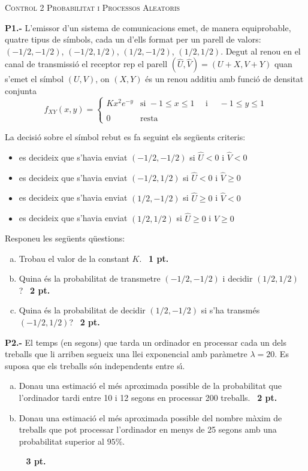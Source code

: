 \documentclass{report}
\begin{document}
\begin{center}
\textsc{Control 2 Probabilitat i Processos Aleatoris}
\end{center}

\vspace{1 cm}
\noindent\textbf{P1.-}
L'emissor d'un sistema de comunicacions emet, de manera equiprobable, quatre
tipus de s\'imbols, cada un d'ells format per un parell de valors:
$(-1/2, -1/2)$, $(-1/2, 1/2)$, $(1/2, -1/2)$, $(1/2, 1/2)$. Degut al renou en el canal de
transmissi\'o el receptor rep el parell $(\hat{U}, \hat{V})=(U+X, V+Y)$ quan
s'emet el s\'imbol $(U, V)$, on $(X, Y)$ \'es un renou additiu amb funci\'o de
densitat conjunta
\[
f_{XY}(x, y)=\begin{cases}
K x^2 e^{-y} & \text{si } -1 \leq x \leq 1 \quad \text{ i } \quad -1 \leq y \leq 1 \\ \\
0 & \text{resta}
\end{cases}
\]

La decisi\'o sobre el s\'imbol rebut es fa seguint els seg\"uents criteris:
\begin{itemize}
\item es decideix que s'havia enviat $(-1/2, -1/2)$ si $\hat{U} < 0$ i $\hat{V} < 0$
\item es decideix que s'havia enviat $(-1/2, 1/2)$ si $\hat{U} < 0$ i $\hat{V} \geq 0$
\item es decideix que s'havia enviat $(1/2, -1/2)$ si $\hat{U} \geq 0$ i $\hat{V} < 0$
\item es decideix que s'havia enviat $(1/2, 1/2)$ si $\hat{U} \geq 0$ i $\hat{V} \geq 0$
\end{itemize}

Responeu les seg\"uents q\"uestions:
\begin{enumerate}[a)]
\item Trobau el valor de la constant $K$.\ \hfill{\textbf{ 1 pt.}}
\item Quina \'es la probabilitat de transmetre $(-1/2, -1/2)$ i decidir $(1/2, 1/2)$?\ \hfill{\textbf{ 2 pt.}}
\item Quina \'es la probabilitat de decidir $(1/2, -1/2)$ si s'ha transm\'es $(-1/2, 1/2)$?\ \hfill{\textbf{ 2 pt.}}
\end{enumerate}


\vspace{0.75 cm}

\noindent\textbf{P2.-}
El temps (en segons) que tarda un ordinador en processar cada un dels treballs que li arriben segueix una llei
exponencial amb par\`ametre $\lambda=20$. Es suposa que els treballs s\'on independents
entre s\'\i .
\begin{enumerate}[a)]
\item Donau una estimaci\'o el m\'es aproximada possible de la probabilitat que l'ordinador
tardi entre 10 i 12 segons en processar 200 treballs.\ \hfill{\textbf{ 2 pt.}}
\item Donau una estimaci\'o el m\'es aproximada possible del nombre m\`axim de treballs que pot processar
l'ordinador en menys de 25 segons amb una probabilitat superior al $95\%$.

$ $ \ \hfill{\textbf{3 pt.}}
\end{enumerate}
\end{document}
